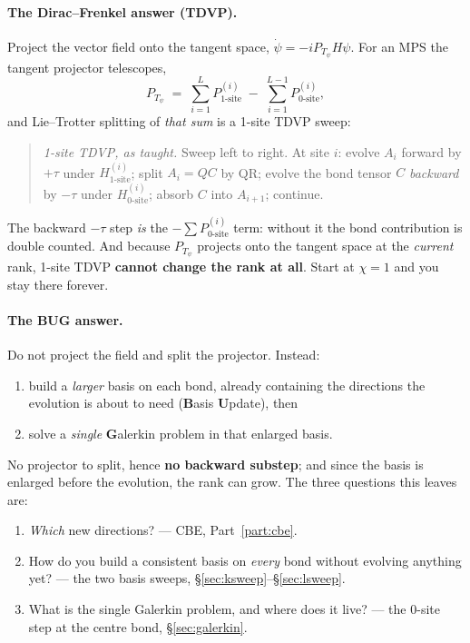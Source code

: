 \documentclass[11pt,a4paper]{article}
\begin{document}
\paragraph{The Dirac--Frenkel answer (TDVP).} Project the vector field onto the tangent space,
$\dot\psi = -i P_{T_\psi}H\psi$. For an MPS the tangent projector telescopes,
\[
  P_{T_\psi} \;=\; \sum_{i=1}^{L} P^{(i)}_{1\text{-site}} \;-\; \sum_{i=1}^{L-1} P^{(i)}_{0\text{-site}},
\]
and Lie--Trotter splitting of \emph{that sum} is a 1-site TDVP sweep:

\begin{quote}
\emph{1-site TDVP, as taught.} Sweep left to right. At site $i$: evolve $A_i$ forward by
$+\tau$ under $H^{(i)}_{1\text{-site}}$; split $A_i = QC$ by QR; evolve the bond tensor $C$
\emph{backward} by $-\tau$ under $H^{(i)}_{0\text{-site}}$; absorb $C$ into $A_{i+1}$; continue.
\end{quote}

The backward $-\tau$ step \emph{is} the $-\sum P^{(i)}_{0\text{-site}}$ term: without it the
bond contribution is double counted. And because $P_{T_\psi}$ projects onto the tangent space
at the \emph{current} rank, 1-site TDVP \textbf{cannot change the rank at all}. Start at
$\chi=1$ and you stay there forever.

\paragraph{The BUG answer.} Do not project the field and split the projector. Instead:
\begin{enumerate}[nosep,leftmargin=1.6em]
  \item build a \emph{larger} basis on each bond, already containing the directions the
        evolution is about to need (\textbf{B}asis \textbf{U}pdate), then
  \item solve a \emph{single} \textbf{G}alerkin problem in that enlarged basis.
\end{enumerate}
No projector to split, hence \textbf{no backward substep}; and since the basis is enlarged
before the evolution, the rank can grow. The three questions this leaves are:

\begin{enumerate}[nosep,leftmargin=1.6em]
  \item[(Q1)] \emph{Which} new directions? --- CBE, Part~\ref{part:cbe}.
  \item[(Q2)] How do you build a consistent basis on \emph{every} bond without evolving
        anything yet? --- the two basis sweeps, \S\ref{sec:ksweep}--\S\ref{sec:lsweep}.
  \item[(Q3)] What is the single Galerkin problem, and where does it live? --- the 0-site step
        at the centre bond, \S\ref{sec:galerkin}.
\end{enumerate}
\end{document}
